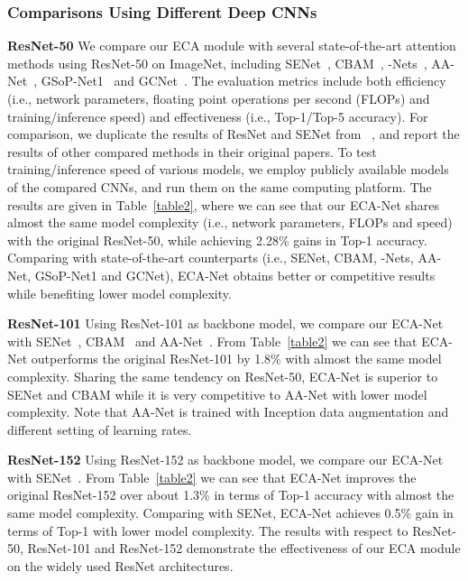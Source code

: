 \documentclass[10pt,twocolumn,letterpaper]{article}
\begin{document}
\subsubsection{Comparisons Using Different Deep CNNs}
\textbf{ResNet-50} We compare our ECA module with several state-of-the-art attention methods using ResNet-50 on ImageNet, including SENet~\cite{SENet18}, CBAM~\cite{Woo_2018_ECCV}, -Nets~\cite{A2NIPS18}, AA-Net~\cite{1904.09925}, GSoP-Net1~\cite{Gao_2019_CVPR} and GCNet~\cite{Cao_2019_ICCV_Workshops}. The evaluation metrics include both efficiency (i.e., network parameters, floating point operations per second (FLOPs) and training/inference speed) and effectiveness (i.e., Top-1/Top-5 accuracy). For comparison, we duplicate the results of ResNet and SENet from ~\cite{SENet18}, and report the results of other compared methods in their original papers. To test training/inference speed of various models, we employ publicly available models of the compared CNNs, and run them on the same computing platform. The results are given in Table~\ref{table2}, where we can see that our ECA-Net shares almost the same model complexity (i.e., network parameters, FLOPs and speed) with the original ResNet-50, while achieving 2.28\% gains in Top-1 accuracy. Comparing with state-of-the-art counterparts (i.e., SENet, CBAM, -Nets, AA-Net, GSoP-Net1 and GCNet), ECA-Net obtains better or competitive results while benefiting lower model complexity. 

\noindent\textbf{ResNet-101} Using ResNet-101 as backbone model, we compare our ECA-Net with SENet~\cite{SENet18}, CBAM~\cite{Woo_2018_ECCV} and AA-Net~\cite{1904.09925}. From Table~\ref{table2} we can see that ECA-Net outperforms the original ResNet-101 by 1.8\% with almost the same model complexity. Sharing the same tendency on ResNet-50, ECA-Net is superior to SENet and CBAM while it is very competitive to AA-Net with lower model complexity. Note that AA-Net is trained with Inception data augmentation and different setting of learning rates.

\noindent\textbf{ResNet-152} Using ResNet-152 as backbone model, we compare our ECA-Net with SENet~\cite{SENet18}. From Table~\ref{table2} we can see that ECA-Net improves the original ResNet-152 over about 1.3\% in terms of Top-1 accuracy with almost the same model complexity. Comparing with SENet, ECA-Net achieves 0.5\% gain in terms of Top-1 with lower model complexity. The results with respect to ResNet-50, ResNet-101 and ResNet-152 demonstrate the effectiveness of our ECA module on the widely used ResNet architectures.
\end{document}
